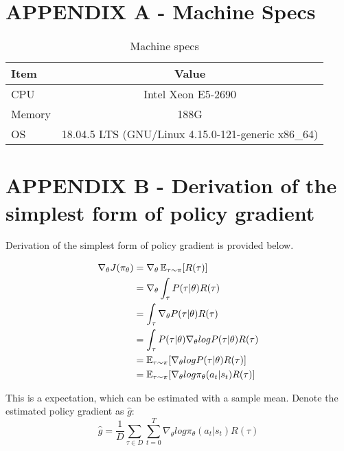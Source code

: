 \chapter*{APPENDIX A - Machine Specs} 
\begin{table*} 
\begin{center} 
\caption{Machine specs}
{\normalsize
\begin{tabular}{l c}
\toprule
Item & Value \\
\midrule
    CPU & Intel Xeon E5-2690 \\ 
    Memory & 188G \\
    OS & 18.04.5 LTS (GNU/Linux 4.15.0-121-generic x86\_64) \\
\bottomrule
\end{tabular}
} \end{center} \end{table*}


\chapter*{APPENDIX B - Derivation of the simplest form of policy gradient}
Derivation of the simplest form of policy gradient is provided below.

\begin{equation*}
    \begin{aligned}[b]
        \nabla_\theta J(\pi_\theta) 
        & = \nabla_\theta \operatorname{\mathbb{E}}_{\tau \sim \pi} [R(\tau)] \\ 
        & = \nabla_\theta \int_\tau P(\tau|\theta) R(\tau)\\
        & =  \int_\tau \nabla_\theta P(\tau|\theta) R(\tau)\\
        & =  \int_\tau P(\tau|\theta) \nabla_\theta log P(\tau|\theta)R(\tau)\\
        & = \operatorname{\mathbb{E}}_{\tau \sim \pi} [\nabla_\theta log P(\tau|\theta)R(\tau)] \\
        & = \operatorname{\mathbb{E}}_{\tau \sim \pi} [\nabla_\theta log \pi_\theta (a_t | s_t)R(\tau)] \\
    \end{aligned}
\end{equation*}

    This is a expectation, which can be estimated with a sample mean. Denote the estimated policy gradient as $\hat{g}$: 
    $$   \hat{g} = \frac{1}{\mathit{D}} \sum_{\tau \in \mathit{D}} \sum_{t=0}^{T} \nabla_\theta log \pi_\theta (a_t | s_t)R(\tau)      $$











